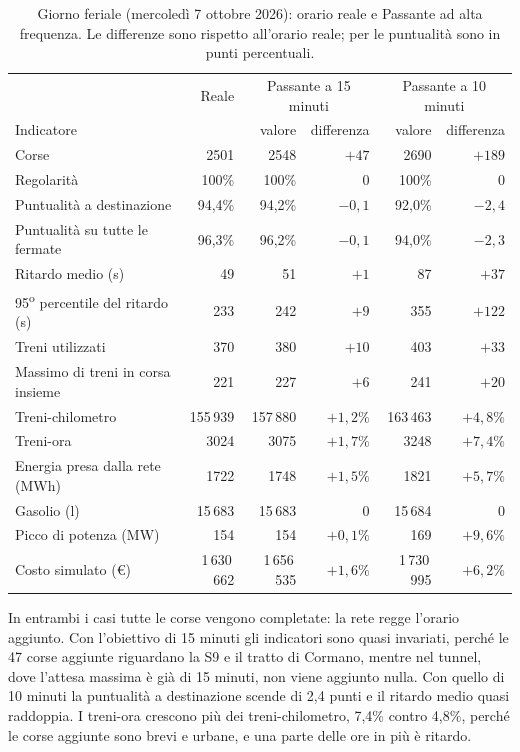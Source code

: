 \begin{table}[H]
	\centering
	\caption{Giorno feriale (mercoledì 7 ottobre 2026): orario reale e Passante ad alta frequenza. Le differenze sono rispetto all'orario reale; per le puntualità sono in punti percentuali.}
	\label{tab:risultati-passante}
	\small
	\begin{tabularx}{\textwidth}{Xrrrrr}
		\toprule
		 & Reale & \multicolumn{2}{c}{Passante a 15 minuti} & \multicolumn{2}{c}{Passante a 10 minuti} \\
		Indicatore & & valore & differenza & valore & differenza \\
		\midrule
		Corse & 2501 & 2548 & $+47$ & 2690 & $+189$ \\
		Regolarità & 100\% & 100\% & 0 & 100\% & 0 \\
		Puntualità a destinazione & 94,4\% & 94,2\% & $-0{,}1$ & 92,0\% & $-2{,}4$ \\
		Puntualità su tutte le fermate & 96,3\% & 96,2\% & $-0{,}1$ & 94,0\% & $-2{,}3$ \\
		Ritardo medio (s) & 49 & 51 & $+1$ & 87 & $+37$ \\
		95\textsuperscript{o} percentile del ritardo (s) & 233 & 242 & $+9$ & 355 & $+122$ \\
		\midrule
		Treni utilizzati & 370 & 380 & $+10$ & 403 & $+33$ \\
		Massimo di treni in corsa insieme & 221 & 227 & $+6$ & 241 & $+20$ \\
		Treni-chilometro & 155\,939 & 157\,880 & $+1{,}2\%$ & 163\,463 & $+4{,}8\%$ \\
		Treni-ora & 3024 & 3075 & $+1{,}7\%$ & 3248 & $+7{,}4\%$ \\
		\midrule
		Energia presa dalla rete (MWh) & 1722 & 1748 & $+1{,}5\%$ & 1821 & $+5{,}7\%$ \\
		Gasolio (l) & 15\,683 & 15\,683 & 0 & 15\,684 & 0 \\
		Picco di potenza (MW) & 154 & 154 & $+0{,}1\%$ & 169 & $+9{,}6\%$ \\
		Costo simulato (\euro) & 1\,630\,662 & 1\,656\,535 & $+1{,}6\%$ & 1\,730\,995 & $+6{,}2\%$ \\
		\bottomrule
	\end{tabularx}
\end{table}

In entrambi i casi tutte le corse vengono completate: la rete regge l'orario aggiunto. Con l'obiettivo di 15 minuti gli indicatori sono quasi invariati, perché le 47 corse aggiunte riguardano la S9 e il tratto di Cormano, mentre nel tunnel, dove l'attesa massima è già di 15 minuti, non viene aggiunto nulla. Con quello di 10 minuti la puntualità a destinazione scende di 2,4 punti e il ritardo medio quasi raddoppia. I treni-ora crescono più dei treni-chilometro, 7,4\% contro 4,8\%, perché le corse aggiunte sono brevi e urbane, e una parte delle ore in più è ritardo.

